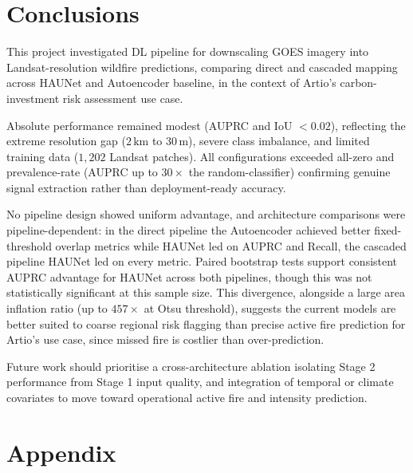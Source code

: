 \documentclass[a4paper, 11pt]{article} %
\begin{document}
\section{Conclusions}
This project investigated DL pipeline for downscaling GOES imagery into Landsat-resolution wildfire predictions, comparing direct and cascaded mapping across HAUNet and Autoencoder baseline, in the context of Artio's carbon-investment risk assessment use case.

Absolute performance remained modest (AUPRC and IoU $<0.02$), reflecting the extreme resolution gap ($2\,\text{km}$ to $30\,\text{m}$), severe class imbalance, and limited training data ($1,202$ Landsat patches). All configurations exceeded all-zero and prevalence-rate (AUPRC up to $30\times$ the random-classifier) confirming genuine signal extraction rather than deployment-ready accuracy.

No pipeline design showed uniform advantage, and architecture comparisons were pipeline-dependent: in the direct pipeline the Autoencoder achieved better fixed-threshold overlap metrics while HAUNet led on AUPRC and Recall, the cascaded pipeline HAUNet led on every metric. Paired bootstrap tests support consistent AUPRC advantage for HAUNet across both pipelines, though this was not statistically significant at this sample size. This divergence, alongside a large area inflation ratio (up to $457\times$ at Otsu threshold), suggests the current models are better suited to coarse regional risk flagging than precise active fire prediction for Artio's use case, since missed fire is costlier than over-prediction.

Future work should prioritise a cross-architecture ablation isolating Stage 2 performance from Stage 1 input quality, and integration of temporal or climate covariates to move toward operational active fire and intensity prediction.

\appendix
\section{Appendix} \label{appendix}
\end{document}
